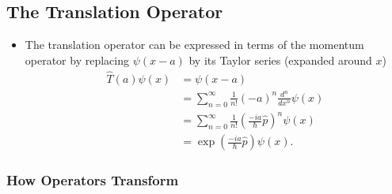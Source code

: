 \documentclass{article}
\begin{document}
\subsection{The Translation Operator}

\begin{itemize}
  \item The translation operator can be expressed in terms of the momentum operator by replacing $\psi(x - a)$ by its Taylor series (expanded around $x$) \begin{align*}
          \hat{T}(a) \psi(x) & = \psi(x - a)                                                                          \\
                             & = \sum_{n = 0}^\infty \frac{1}{n!} (-a)^n \frac{d^n}{d x^n} \psi(x)                    \\
                             & = \sum_{n = 0}^\infty \frac{1}{n!} \left( \frac{-i a}{\hbar} \hat{p} \right)^n \psi(x) \\
                             & = \exp \left( \frac{-i a}{\hbar} \hat{p} \right) \psi(x).
        \end{align*}
\end{itemize}

\subsubsection{How Operators Transform}
\end{document}
